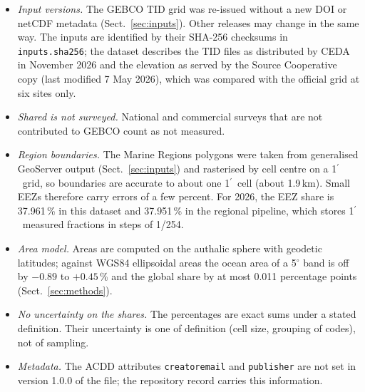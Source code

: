 \documentclass[essd, manuscript]{copernicus}
\newcommand{\am}{$^{\prime}$}            %
\renewcommand{\_}{\usorig\allowbreak}
\begin{document}
\begin{itemize}
\item \textit{Input versions.} The GEBCO\_2023 TID grid was re-issued without a new DOI or netCDF metadata (Sect.~\ref{sec:inputs}). Other releases may change in the same way. The inputs are identified by their SHA-256 checksums in \texttt{inputs.sha256}; the dataset describes the TID files as distributed by CEDA in November 2026 and the elevation as served by the Source Cooperative copy (last modified 7 May 2026), which was compared with the official grid at six sites only.
\item \textit{Shared is not surveyed.} National and commercial surveys that are not contributed to GEBCO count as not measured.
\item \textit{Region boundaries.} The Marine Regions polygons were taken from generalised GeoServer output (Sect.~\ref{sec:inputs}) and rasterised by cell centre on a 1\am\ grid, so boundaries are accurate to about one 1\am\ cell (about 1.9\,km). Small EEZs therefore carry errors of a few percent. For 2026, the EEZ share is 37.961\,\% in this dataset and 37.951\,\% in the regional pipeline, which stores 1\am\ measured fractions in steps of 1/254.
\item \textit{Area model.} Areas are computed on the authalic sphere with geodetic latitudes; against WGS84 ellipsoidal areas the ocean area of a 5$^\circ$ band is off by $-0.89$ to $+0.45$\,\% and the global share by at most 0.011 percentage points (Sect.~\ref{sec:methods}).
\item \textit{No uncertainty on the shares.} The percentages are exact sums under a stated definition. Their uncertainty is one of definition (cell size, grouping of codes), not of sampling.
\item \textit{Metadata.} The ACDD attributes \texttt{creator\_email} and \texttt{publisher\_*} are not set in version 1.0.0 of the file; the repository record carries this information.
\end{itemize}

\conclusions
\end{document}
